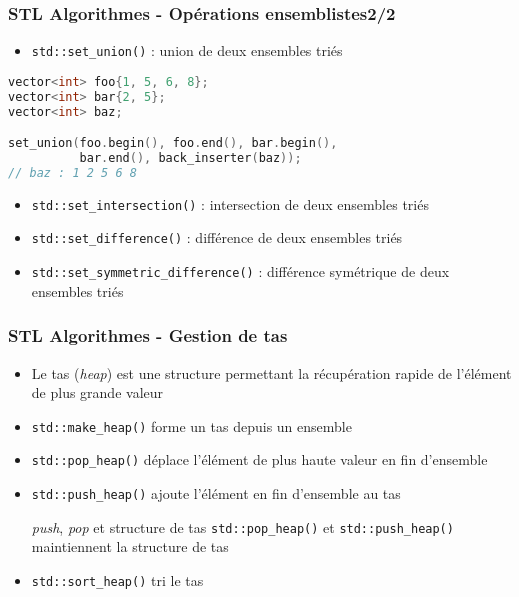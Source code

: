 \documentclass[C++.tex]{subfiles}
\begin{document}
\begin{frame}[fragile]
	\frametitle{STL Algorithmes - Opérations ensemblistes\titlehfill{}2/2}
	\begin{itemize}
		\item \lstinline|std::set_union()| : union de deux ensembles triés
	\end{itemize}

	\begin{lstlisting}[language=C++]
vector<int> foo{1, 5, 6, 8};
vector<int> bar{2, 5};
vector<int> baz;

set_union(foo.begin(), foo.end(), bar.begin(),
          bar.end(), back_inserter(baz));
// baz : 1 2 5 6 8\end{lstlisting}

	\begin{itemize}
		\item \lstinline|std::set_intersection()| : intersection de deux ensembles triés
		\item \lstinline|std::set_difference()| : différence de deux ensembles triés
		\item \lstinline|std::set_symmetric_difference()| : différence symétrique de deux ensembles triés

	\end{itemize}
\end{frame}

\begin{frame}[fragile]
	\frametitle{STL Algorithmes - Gestion de \og tas\fg{}}
	\begin{itemize}
		\item Le tas (\textit{heap}) est une structure permettant la récupération rapide de l'élément de plus grande valeur
		\item \lstinline|std::make_heap()| forme un tas depuis un ensemble
		\item \lstinline|std::pop_heap()| déplace l'élément de plus haute valeur en fin d'ensemble
		\item \lstinline|std::push_heap()| ajoute l'élément en fin d'ensemble au tas

		\begin{block}{\textit{push}, \textit{pop} et structure de tas}
			\lstinline|std::pop_heap()| et \lstinline|std::push_heap()| maintiennent la structure de tas
		\end{block}

		\item \lstinline|std::sort_heap()| tri le tas
	\end{itemize}
\end{frame}
\end{document}
